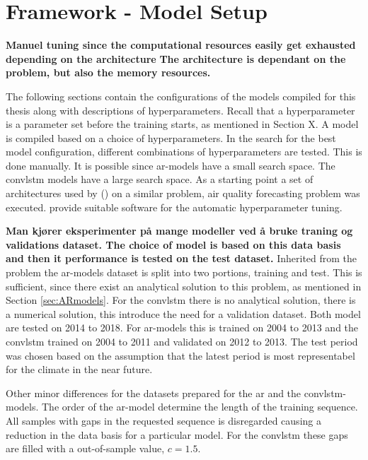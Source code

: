 \section{Framework - Model Setup}
\textbf{Manuel tuning since the computational resources easily get exhausted depending on the architecture}
\textbf{The architecture is dependant on the problem, but also the memory resources.}

The following sections contain the configurations of the models compiled for this thesis along with descriptions of hyperparameters. Recall that a hyperparameter is a parameter set before the training starts, as mentioned in Section X. A model is compiled based on a choice of hyperparameters. In the search for the best model configuration, different combinations of hyperparameters are tested. This is done manually. It is possible since \acrshort{ar}-models have a small search space.  The \acrshort{convlstm} models have a large search space. As a starting point a set of architectures used by \citeauthor{SunAirLSTM} (\citeyear{SunAirLSTM}) on a similar problem, air quality forecasting problem was executed.  provide suitable software for the automatic hyperparameter tuning. 

\textbf{Man kjører eksperimenter på mange modeller ved å bruke traning og validations dataset. The choice of model is based on this data basis and then it performance is tested on the test dataset. }
Inherited from the problem the \acrshort{ar}-models dataset is split into two portions, training and test. This is sufficient, since there exist an analytical solution to this problem, as mentioned in Section \ref{sec:ARmodels}. For the \acrshort{convlstm} there is no analytical solution, there is a numerical solution, this introduce the need for a validation dataset. Both model are tested on 2014 to 2018. For \acrshort{ar}-models this is trained on 2004 to 2013 and the \acrshort{convlstm} trained on  2004 to 2011 and validated on  2012 to 2013. The test period was chosen based on the assumption that the latest period is most representabel for the climate in the near future.

Other minor differences for the datasets prepared for the \acrshort{ar} and the \acrshort{convlstm}-models. The order of the \acrshort{ar}-model determine the length of the training sequence. All samples with gaps in the requested sequence is disregarded causing a reduction in the data basis for a particular model. For the \acrshort{convlstm} these gaps are filled with a out-of-sample value, $c=1.5$.


